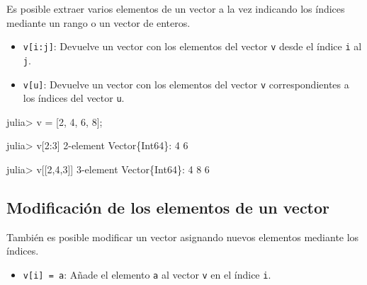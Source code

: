 \documentclass[
  letterpaper,
  DIV=11,
  numbers=noendperiod]{scrreprt}
\newenvironment{Shaded}{\begin{snugshade}}{\end{snugshade}}
\newcommand{\DataTypeTok}[1]{\textcolor[rgb]{0.68,0.00,0.00}{#1}}
\newcommand{\FloatTok}[1]{\textcolor[rgb]{0.68,0.00,0.00}{#1}}
\newcommand{\NormalTok}[1]{\textcolor[rgb]{0.00,0.23,0.31}{#1}}
\newcommand{\OperatorTok}[1]{\textcolor[rgb]{0.37,0.37,0.37}{#1}}
\providecommand{\tightlist}{%
  \setlength{\itemsep}{0pt}\setlength{\parskip}{0pt}}\usepackage{longtable,booktabs,array}
\begin{document}
Es posible extraer varios elementos de un vector a la vez indicando los
índices mediante un rango o un vector de enteros.

\begin{itemize}
\tightlist
\item
  \texttt{v{[}i:j{]}}: Devuelve un vector con los elementos del vector
  \texttt{v} desde el índice \texttt{i} al \texttt{j}.
\item
  \texttt{v{[}u{]}}: Devuelve un vector con los elementos del vector
  \texttt{v} correspondientes a los índices del vector \texttt{u}.
\end{itemize}

\begin{Shaded}
\begin{Highlighting}[]
\NormalTok{julia}\OperatorTok{\textgreater{}}\NormalTok{ v }\OperatorTok{=}\NormalTok{ [}\FloatTok{2}\NormalTok{, }\FloatTok{4}\NormalTok{, }\FloatTok{6}\NormalTok{, }\FloatTok{8}\NormalTok{];}

\NormalTok{julia}\OperatorTok{\textgreater{}}\NormalTok{ v[}\FloatTok{2}\OperatorTok{:}\FloatTok{3}\NormalTok{]}
\FloatTok{2}\OperatorTok{{-}}\NormalTok{element }\DataTypeTok{Vector}\NormalTok{\{}\DataTypeTok{Int64}\NormalTok{\}}\OperatorTok{:}
 \FloatTok{4}
 \FloatTok{6}

\NormalTok{julia}\OperatorTok{\textgreater{}}\NormalTok{ v[[}\FloatTok{2}\NormalTok{,}\FloatTok{4}\NormalTok{,}\FloatTok{3}\NormalTok{]]}
\FloatTok{3}\OperatorTok{{-}}\NormalTok{element }\DataTypeTok{Vector}\NormalTok{\{}\DataTypeTok{Int64}\NormalTok{\}}\OperatorTok{:}
 \FloatTok{4}
 \FloatTok{8}
 \FloatTok{6}
\end{Highlighting}
\end{Shaded}

\hypertarget{modificaciuxf3n-de-los-elementos-de-un-vector}{%
\subsection{Modificación de los elementos de un
vector}\label{modificaciuxf3n-de-los-elementos-de-un-vector}}

También es posible modificar un vector asignando nuevos elementos
mediante los índices.

\begin{itemize}
\tightlist
\item
  \texttt{v{[}i{]}\ =\ a}: Añade el elemento \texttt{a} al vector
  \texttt{v} en el índice \texttt{i}.
\end{itemize}
\end{document}
